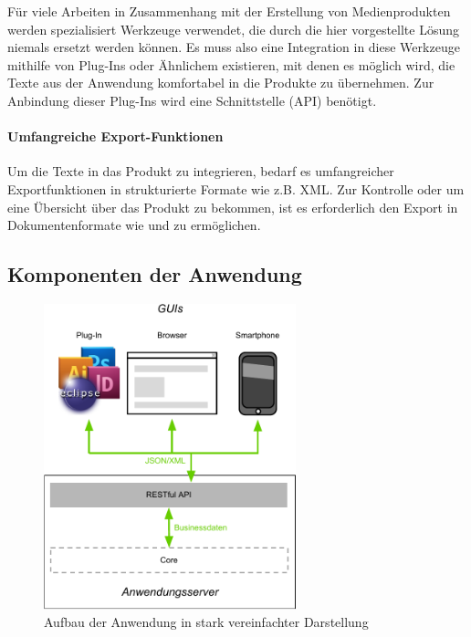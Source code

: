 Für viele Arbeiten in Zusammenhang mit der Erstellung von Medienprodukten werden spezialisiert Werkzeuge verwendet, die durch die hier vorgestellte Lösung niemals ersetzt werden können. Es muss also eine Integration in diese Werkzeuge mithilfe von Plug-Ins oder Ähnlichem existieren, mit denen es möglich wird, die Texte aus der Anwendung komfortabel in die Produkte zu übernehmen. Zur Anbindung dieser Plug-Ins wird eine Schnittstelle (API) benötigt.

\paragraph{Umfangreiche Export-Funktionen}

Um die Texte in das Produkt zu integrieren, bedarf es umfangreicher Exportfunktionen in strukturierte Formate wie z.B. XML. Zur Kontrolle oder um eine Übersicht über das Produkt zu bekommen, ist es erforderlich den Export in Dokumentenformate wie  und  zu ermöglichen.

\pagebreak

\subsection{Komponenten der Anwendung}\label{l:loesungsart}

\begin{figure}[htb]
\begin{center}
\includegraphics[width=0.65\textwidth]{media/ArtdesSystems.pdf}
\caption{Aufbau der Anwendung in stark vereinfachter Darstellung}
\label{chart:aufbaudessystems}
\end{center}
\end{figure}

